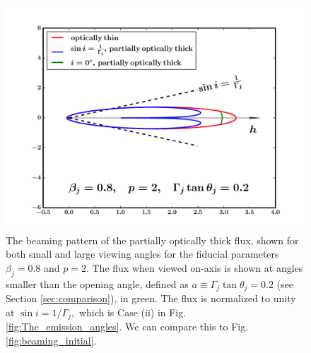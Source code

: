 \begin{figure}
\noindent \centering{}\includegraphics[scale=0.6]{beaming_final.pdf}\caption{The beaming pattern of the partially optically thick flux, shown for both small and large viewing angles for the fiducial parameters $ \beta_j = 0.8 $ and $ p = 2 . $ The flux when viewed on-axis is shown at angles smaller than the opening angle, defined as $ a \equiv \Gamma_j \tan \theta_j = 0.2 $ (see Section \ref{sec:comparison}), in green. The flux is normalized to unity at $ \sin i = 1 / \Gamma_j , $ which is Case (ii) in Fig. \ref{fig:The_emission_angles}. We can compare this to Fig. \ref{fig:beaming_initial}.}
\label{fig:beaming_final}
\end{figure}

